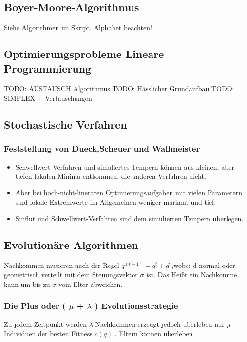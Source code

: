 \subsection{Boyer-Moore-Algorithmus}
Siehe Algorithmen im Skript. Alphabet beachten!


\subsection{Optimierungsprobleme Lineare Programmierung}

TODO: AUSTAUSCH Algorithmus
TODO: Hässlicher Grundaufbau
TODO: SIMPLEX + Vertauschungen


\subsection{Stochastische Verfahren}
\subsubsection{Feststellung von 
Dueck,Scheuer und Wallmeister}
\begin{itemize}
	\item Schwellwert-Verfahren 
und simuliertes Tempern können aus 
kleinen, aber tiefen lokalen Minima 
entkommen, die anderen Verfahren 
nicht.
	\item Aber bei 
hoch-nicht-lineraren 
Optimierungsaufgaben mit vielen 
Parametern sind lokale Extremwerte im 
Allgemeinen weniger markant und tief.
	\item Sinflut und 
Schwellwert-Verfahren sind dem 
simulierten Tempern überlegen.
\end{itemize}


\subsection{Evolutionäre Algorithmen}
Nachkommen mutieren nach der Regel 
$q^(t+1) = q^t +d$ ,wobei d normal 
oder geometrisch verteilt mit dem 
Steuungsvektor $\sigma$ ist. Das 
Heißt 
ein Nachkomme kann um bis zu $\sigma$ 
vom Elter abweichen.

\subsubsection{ Die Plus oder ( $\mu$ 
+ 
$\lambda$ ) Evolutionsstrategie}
Zu jedem Zeitpunkt werden $\lambda$ 
Nachkommen erzeugt jedoch überleben 
nur $\mu$ Individuen der besten 
Fitness 
$c(q)$ . Eltern können überleben

